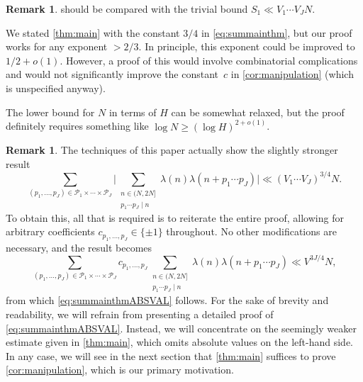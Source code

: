 \documentclass[11pt]{amsart}
\theoremstyle{definition}
\newtheorem{remark}[theorem]{Remark}
\renewcommand{\geq}{\geqslant}
\newcommand{\primes}{\mathcal{P}}
\newcommand{\curlyL}{V}
\newcommand{\curlyLexp}[1]{V^{#1}}
\newcommand{\repR}{J}
\begin{document}
\begin{remark}
\label{rem:L} should be compared with the trivial bound $S_1 \ll \curlyL_1\cdots \curlyL_{\repR} N$. 

We stated \cref{thm:main} with the constant $3/4$ in \cref{eq:summainthm}, but our proof works for any exponent $>2/3$. In principle, this exponent could be improved to $1/2+o(1)$. However, a proof of this would involve combinatorial complications and would not significantly improve the constant~$c$ in \cref{cor:manipulation} (which is unspecified anyway).

The lower bound for $N$ in terms of $H$ can be somewhat relaxed, but the proof definitely requires something like $\log N \geq (\log H)^{2+o(1)}$.
\end{remark}


\begin{remark}
\label{rem:withabsval}
The techniques of this paper actually show the slightly stronger result
\begin{equation}
\label{eq:summainthmABSVAL}
	\sum_{(p_1, \ldots, p_{\repR})\in \primes_1\times \cdots \times \primes_{\repR}} \Bigg\lvert \sum_{\substack{n\in (N, 2N] \\ p_1\cdots p_{\repR} \mid n}}\lambda(n) \lambda(n+p_1\cdots p_{\repR})  \Bigg\rvert \ll (\curlyL_1\cdots \curlyL_{\repR})^{3/4} N.
\end{equation}
To obtain this, all that is required is to reiterate the entire proof, allowing for arbitrary coefficients $c_{p_1, \ldots, p_{\repR}} \in \{\pm 1\}$ throughout. No other modifications are necessary, and the result becomes
\begin{equation*}
\sum_{(p_1, \ldots, p_{\repR})\in \primes_1\times \cdots \times \primes_{\repR}} c_{p_1, \ldots, p_{\repR}} \sum_{\substack{n\in (N, 2N] \\ p_1\cdots p_{\repR} \mid n}}\lambda(n) \lambda(n+p_1\cdots p_{\repR}) \ll \curlyLexp{3\repR/4} N,
\end{equation*}
from which \cref{eq:summainthmABSVAL} follows. For the sake of brevity and readability, we will refrain from presenting a detailed proof of \cref{eq:summainthmABSVAL}. Instead, we will concentrate on the seemingly weaker estimate given in \cref{thm:main}, which omits absolute values on the left-hand side. In any case, we will see in the next section that \cref{thm:main} suffices to prove \cref{cor:manipulation}, which is our primary motivation.
\end{remark}
\end{document}
